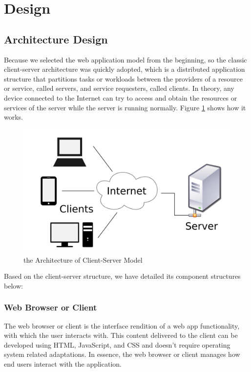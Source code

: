 \section{Design}
\label{sec:Design}

\subsection{Architecture Design}
Because we selected the web application model from the beginning, so the classic client-server architecture was quickly adopted, which is a distributed application structure that partitions tasks or workloads between the providers of a resource or service, called servers, and service requesters, called clients. In theory, any device connected to the Internet can try to access and obtain the resources or services of the server while the server is running normally. Figure \ref{Client-Server Architecture} shows how it works.

\begin{figure}[htb]
\centering
\includegraphics[width=\textwidth]{section03/assets/client_server.png}
\caption[the Architecture of Client-Server Model]{\label{Client-Server Architecture}the Architecture of Client-Server Model}
\end{figure}

Based on the client-server structure, we have detailed its component structures below:
\subsubsection{Web Browser or Client}
The web browser or client is the interface rendition of a web app functionality, with which the user interacts with. This content delivered to the client can be developed using HTML, JavaScript, and CSS and doesn’t require operating system related adaptations. In essence, the web browser or client manages how end users interact with the application.

